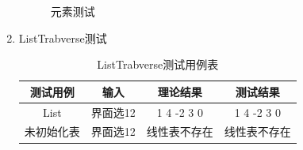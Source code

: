 \documentclass[supercite]{HustGraduPaper}
\theoremstyle{definition}
\begin{document}
\begin{enumerate}
\begin{figure}[htb]
		      \caption{元素测试}
	      \end{figure}
	      \newpage
	\item ListTrabverse测试
	      \begin{table}[htb]
		      \begin{center}
			      \setlength{\tabcolsep}{2.0mm}
			      \caption{ListTrabverse测试用例表}
			      \label{table11}
			      \begin{tabular}{|c|c|c|c|}
				      \hline
				      测试用例   & 输入     & 理论结果     & 测试结果     \\
				      \hline
				      \hline
				      List       & 界面选12 & 1 4 -2 3 0   & 1 4 -2 3 0   \\
				      \hline
				      未初始化表 & 界面选12 & 线性表不存在 & 线性表不存在 \\
				      \hline
			      \end{tabular}
		      \end{center}
	      \end{table}
	      \begin{figure}[htb]
		      \centering
		      \quad
		      \\

\end{figure}
\end{enumerate}
\end{document}
